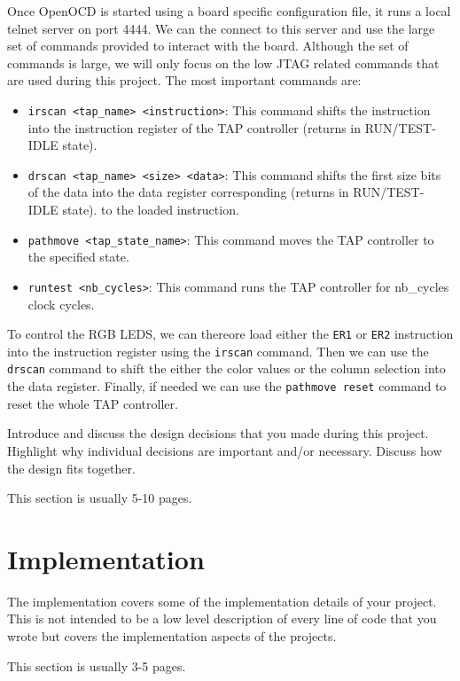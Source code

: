 \documentclass[a4paper,11pt,oneside]{report}
\begin{document}
Once OpenOCD is started using a board specific configuration file, it runs a local telnet server on port 4444.
We can the connect to this server and use the large set of commands provided to interact with the board.
Although the set of commands is large, we will only focus on the low JTAG related commands that are used during this project.
The most important commands are:
\begin{itemize}
    \item \verb|irscan <tap_name> <instruction>|: This command shifts the instruction into the instruction register of the TAP controller (returns in RUN/TEST-IDLE state).
    \item \verb|drscan <tap_name> <size> <data>|: This command shifts the first size bits of the data into the data register corresponding (returns in RUN/TEST-IDLE state).
    to the loaded instruction.
    \item \verb|pathmove <tap_state_name>|: This command moves the TAP controller to the specified state.
    \item \verb|runtest <nb_cycles>|: This command runs the TAP controller for nb\_cycles clock cycles.
\end{itemize}

To control the RGB LEDS, we can thereore load either the \texttt{ER1} or \texttt{ER2} instruction into the instruction register using the \texttt{irscan} command.
Then we can use the \texttt{drscan} command to shift the either the color values or the column selection into the data register.
Finally, if needed we can use the \texttt{pathmove reset} command to reset the whole TAP controller.


Introduce and discuss the design decisions that you made during this project.
Highlight why individual decisions are important and/or necessary. Discuss
how the design fits together.

This section is usually 5-10 pages.


\chapter{Implementation}

The implementation covers some of the implementation details of your project.
This is not intended to be a low level description of every line of code that
you wrote but covers the implementation aspects of the projects.

This section is usually 3-5 pages.
\end{document}
